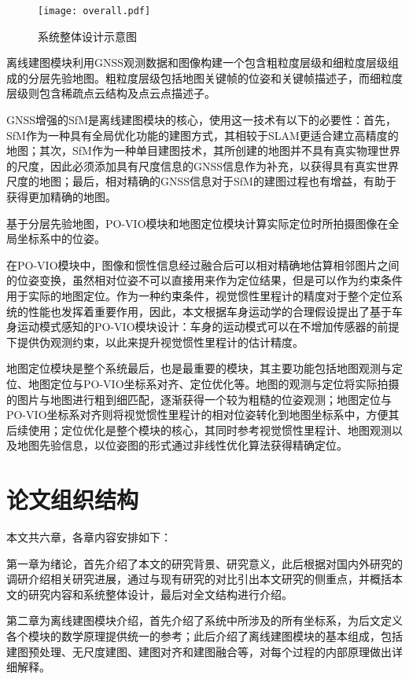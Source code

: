 \begin{figure}
  \centering
  \texttt{[image: overall.pdf]}
  \caption{系统整体设计示意图}
  \label{fig:overall}
\end{figure}

离线建图模块利用GNSS观测数据和图像构建一个包含粗粒度层级和细粒度层级组成的分层先验地图。粗粒度层级包括地图关键帧的位姿和关键帧描述子，而细粒度层级则包含稀疏点云结构及点云点描述子。

GNSS增强的SfM是离线建图模块的核心，使用这一技术有以下的必要性：首先，SfM作为一种具有全局优化功能的建图方式，其相较于SLAM更适合建立高精度的地图；其次，SfM作为一种单目建图技术，其所创建的地图并不具有真实物理世界的尺度，因此必须添加具有尺度信息的GNSS信息作为补充，以获得具有真实世界尺度的地图；最后，相对精确的GNSS信息对于SfM的建图过程也有增益，有助于获得更加精确的地图。

基于分层先验地图，PO-VIO模块和地图定位模块计算实际定位时所拍摄图像在全局坐标系中的位姿。

在PO-VIO模块中，图像和惯性信息经过融合后可以相对精确地估算相邻图片之间的位姿变换，虽然相对位姿不可以直接用来作为定位结果，但是可以作为约束条件用于实际的地图定位。作为一种约束条件，视觉惯性里程计的精度对于整个定位系统的性能也发挥着重要作用，因此，本文根据车身运动学的合理假设提出了基于车身运动模式感知的PO-VIO模块设计：车身的运动模式可以在不增加传感器的前提下提供伪观测约束，以此来提升视觉惯性里程计的估计精度。

地图定位模块是整个系统最后，也是最重要的模块，其主要功能包括地图观测与定位、地图定位与PO-VIO坐标系对齐、定位优化等。地图的观测与定位将实际拍摄的图片与地图进行粗到细匹配，逐渐获得一个较为粗糙的位姿观测；地图定位与PO-VIO坐标系对齐则将视觉惯性里程计的相对位姿转化到地图坐标系中，方便其后续使用；定位优化是整个模块的核心，其同时参考视觉惯性里程计、地图观测以及地图先验信息，以位姿图的形式通过非线性优化算法获得精确定位。

\section{论文组织结构}
本文共六章，各章内容安排如下：

第一章为绪论，首先介绍了本文的研究背景、研究意义，此后根据对国内外研究的调研介绍相关研究进展，通过与现有研究的对比引出本文研究的侧重点，并概括本文的研究内容和系统整体设计，最后对全文结构进行介绍。

第二章为离线建图模块介绍，首先介绍了系统中所涉及的所有坐标系，为后文定义各个模块的数学原理提供统一的参考；此后介绍了离线建图模块的基本组成，包括建图预处理、无尺度建图、建图对齐和建图融合等，对每个过程的内部原理做出详细解释。

